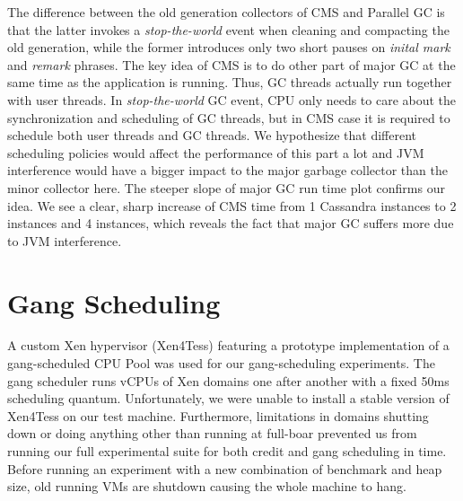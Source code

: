 \documentclass{sig-alternate}
\begin{document}
The difference between the old generation collectors of CMS and Parallel GC is that the latter invokes a \textit{stop-the-world} event when cleaning and compacting the old generation, while the former introduces only two short pauses on \textit{inital mark} and \textit{remark} phrases. The key idea of CMS is to do other part of major GC at the same time as the application is running. Thus, GC threads actually run together with user threads. In \textit{stop-the-world} GC event, CPU only needs to care about the synchronization and scheduling of GC threads, but in CMS case it is required to schedule both user threads and GC threads. We hypothesize that different scheduling policies would affect the performance of this part a lot and JVM interference would have a bigger impact to the major garbage collector than the minor collector here. The steeper slope of major GC run time plot confirms our idea. We see a clear, sharp increase of CMS time from 1 Cassandra instances to 2 instances and 4 instances, which reveals the fact that major GC suffers more due to JVM interference.


%


\section{Gang Scheduling}
A custom Xen hypervisor (Xen4Tess) featuring a prototype implementation of a gang-scheduled CPU Pool was used for our gang-scheduling experiments. The gang scheduler runs vCPUs of Xen domains one after another with a fixed 50ms scheduling quantum. Unfortunately, we were unable to install a stable version of Xen4Tess on our test machine. Furthermore, limitations in domains shutting down or doing anything other than running at full-boar prevented us from running our full experimental suite for both credit and gang scheduling in time. Before running an experiment with a new combination of benchmark and heap size, old running VMs are shutdown causing the whole machine to hang.
\end{document}
